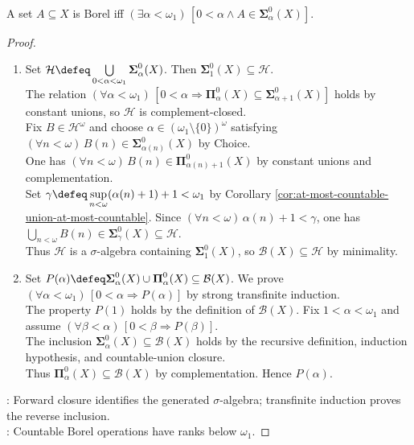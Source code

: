 \begin{theorem} \label{thm:borel-hierarchy-exhausts-borel-sets} \\
A set $A\subseteq X$ is Borel iff $(\exists\alpha<\omega_1)\,[0<\alpha\land A\in\boldsymbol{\Sigma}^{0}_{\alpha}(X)]$.
\begin{proof}
\begin{enumerate}[label=\roman*.]
\setlength{\itemsep}{0pt}
\item[$(\Rightarrow)$] Set $\mathcal{H}\defeq\bigcup\limits_{0<\alpha<\omega_1}\boldsymbol{\Sigma}^{0}_{\alpha}(X)$. Then $\boldsymbol{\Sigma}^{0}_{1}(X)\subseteq\mathcal{H}$.\\
The relation $(\forall\alpha<\omega_1)\,[0<\alpha\Rightarrow\boldsymbol{\Pi}^{0}_{\alpha}(X)\subseteq\boldsymbol{\Sigma}^{0}_{\alpha+1}(X)]$ holds by constant unions, so $\mathcal{H}$ is complement-closed.\\
Fix $B\in\mathcal{H}^{\omega}$ and choose $\alpha\in(\omega_1\setminus\{0\})^{\omega}$ satisfying $(\forall n<\omega)\,B(n)\in\boldsymbol{\Sigma}^{0}_{\alpha(n)}(X)$ by Choice.\\
One has $(\forall n<\omega)\,B(n)\in\boldsymbol{\Pi}^{0}_{\alpha(n)+1}(X)$ by constant unions and complementation.\\
Set $\gamma\defeq\sup\limits_{n<\omega}(\alpha(n)+1)+1<\omega_1$ by Corollary \ref{cor:at-most-countable-union-at-most-countable}. Since $(\forall n<\omega)\,\alpha(n)+1<\gamma$, one has $\bigcup\limits_{n<\omega}B(n)\in\boldsymbol{\Sigma}^{0}_{\gamma}(X)\subseteq\mathcal{H}$.\\
Thus $\mathcal{H}$ is a $\sigma$-algebra containing $\boldsymbol{\Sigma}^{0}_{1}(X)$, so $\mathcal{B}(X)\subseteq\mathcal{H}$ by minimality.
\item[$(\Leftarrow)$] Set $P(\alpha)\defeq\boldsymbol{\Sigma}^{0}_{\alpha}(X)\cup\boldsymbol{\Pi}^{0}_{\alpha}(X)\subseteq\mathcal{B}(X)$. We prove $(\forall\alpha<\omega_1)\,[0<\alpha\Rightarrow P(\alpha)]$ by strong transfinite induction.\\
The property $P(1)$ holds by the definition of $\mathcal{B}(X)$. Fix $1<\alpha<\omega_1$ and assume $(\forall\beta<\alpha)\,[0<\beta\Rightarrow P(\beta)]$.\\
The inclusion $\boldsymbol{\Sigma}^{0}_{\alpha}(X)\subseteq\mathcal{B}(X)$ holds by the recursive definition, induction hypothesis, and countable-union closure.\\
Thus $\boldsymbol{\Pi}^{0}_{\alpha}(X)\subseteq\mathcal{B}(X)$ by complementation. Hence $P(\alpha)$.
\end{enumerate}
: Forward closure identifies the generated $\sigma$-algebra; transfinite induction proves the reverse inclusion.\\
: Countable Borel operations have ranks below $\omega_1$.
\end{proof}
\end{theorem}

